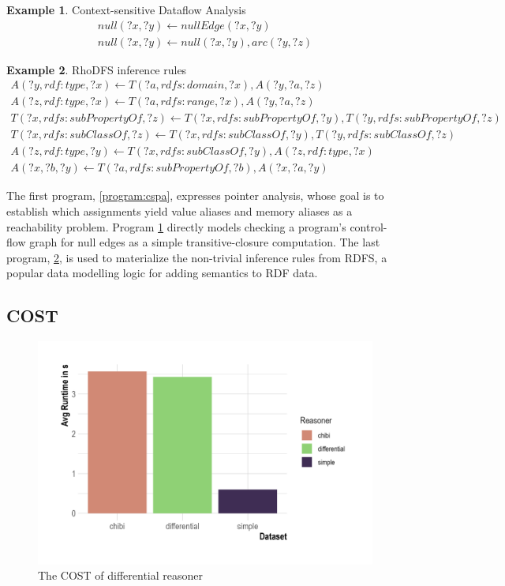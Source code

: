 \documentclass[sigconf,screen,review,natbib]{acmart}
\theoremstyle{definition}
\newtheorem{exmp}{Example}[section]
\begin{document}
\begin{exmp}{Context-sensitive Dataflow Analysis}
	\tiny
	\begin{align}
		null(?x, ?y) \leftarrow nullEdge(?x, ?y) \\
		null(?x, ?y) \leftarrow null(?x, ?y), arc(?y, ?z)
	\end{align}
	\label{program:csda}
\end{exmp}

\begin{exmp}{RhoDFS inference rules}
	\tiny
	\begin{align}
		A(?y, rdf:type, ?x) \leftarrow T(?a, rdfs:domain, ?x), A(?y, ?a, ?z)                                  \\
		A(?z, rdf:type, ?x) \leftarrow T(?a, rdfs:range, ?x), A(?y, ?a, ?z)                                   \\
		T(?x, rdfs:subPropertyOf, ?z) \leftarrow T(?x, rdfs:subPropertyOf, ?y), T(?y, rdfs:subPropertyOf, ?z) \\
		T(?x, rdfs:subClassOf, ?z) \leftarrow T(?x, rdfs:subClassOf, ?y), T(?y, rdfs:subClassOf, ?z)          \\
		A(?z, rdf:type, ?y) \leftarrow T(?x, rdfs:subClassOf, ?y), A(?z, rdf:type, ?x)                        \\
		A(?x, ?b, ?y) \leftarrow T(?a, rdfs:subPropertyOf, ?b), A(?x, ?a, ?y)
	\end{align}
	\label{program:rhodfs}
\end{exmp}

The first program, \ref{program:cspa}\cite{graspan}, expresses pointer analysis, whose goal is to establish which assignments yield value aliases and memory aliases as a reachability problem. Program \ref{program:csda} directly models checking a program's control-flow graph for null edges as a simple transitive-closure computation. The last program, \ref{program:rhodfs}, is used to materialize the non-trivial inference rules from RDFS\cite{rdfs}, a popular data modelling logic for adding semantics to RDF\cite{rdf} data.

\subsection{COST}

\begin{figure}[htb!]
	\centering
	\includegraphics[width=.45\textwidth,height=\textheight,keepaspectratio]{COST}
	\caption{The COST of differential reasoner}
	\label{benchmark:cost}
\end{figure}
\end{document}
